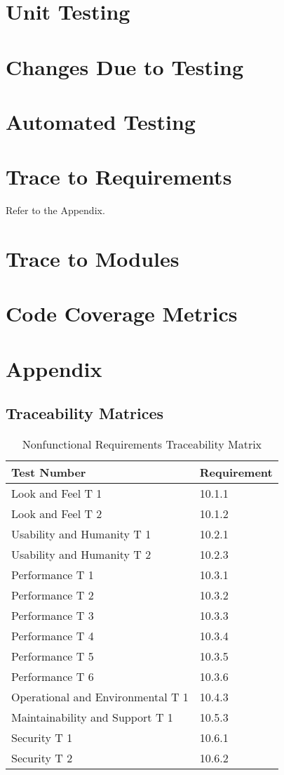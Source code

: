 \documentclass[12pt, titlepage]{article}
\begin{document}
\section{Unit Testing}

\section{Changes Due to Testing}

\section{Automated Testing}
		
\section{Trace to Requirements}
Refer to the Appendix.
		
\section{Trace to Modules}		

\section{Code Coverage Metrics}

\newpage
\section*{Appendix}
\subsection*{Traceability Matrices}
\begin{table}[H]
	\caption{Nonfunctional Requirements Traceability Matrix} \label{TraceMatrix2}
	\begin{tabular}{ll}
		\toprule
		\textbf{Test Number} & \textbf{Requirement} \\
		\midrule
		Look and Feel T 1 & 10.1.1\\
		Look and Feel T 2 & 10.1.2\\
		\midrule
		Usability and Humanity T 1 & 10.2.1\\
		Usability and Humanity T 2 & 10.2.3\\
		\midrule
		Performance T 1 & 10.3.1\\
		Performance T 2 & 10.3.2\\
		Performance T 3 & 10.3.3\\
		Performance T 4 & 10.3.4\\
		Performance T 5 & 10.3.5\\
		Performance T 6 & 10.3.6\\
		\midrule
		Operational and Environmental T 1 & 10.4.3\\
		\midrule
		Maintainability and Support T 1 & 10.5.3\\
		\midrule
		Security T 1 & 10.6.1\\
		Security T 2 & 10.6.2\\
		\bottomrule
	\end{tabular}
\end{table}
\end{document}
